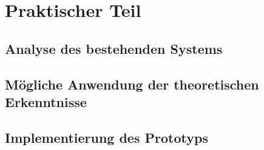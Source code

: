 \section{Praktischer Teil}
\subsection{Analyse des bestehenden Systems}
\subsection{Mögliche Anwendung der theoretischen Erkenntnisse}
\subsection{Implementierung des Prototyps}


 
